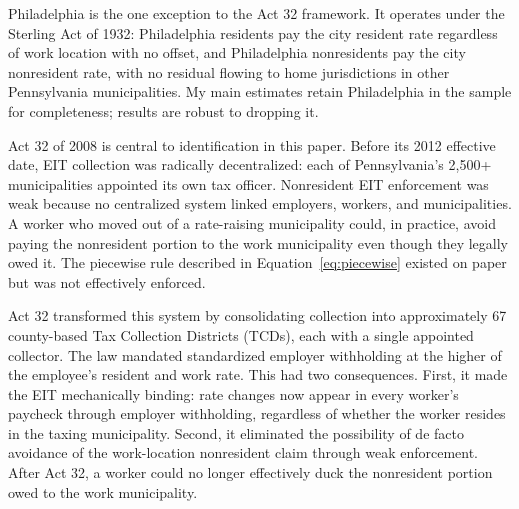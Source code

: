 \documentclass[12pt]{article}
\begin{document}
Philadelphia is the one exception to the Act 32 framework. It operates under
the Sterling Act of 1932: Philadelphia residents pay the city resident
rate regardless of work location with no offset, and Philadelphia
nonresidents pay the city nonresident rate, with no residual flowing
to home jurisdictions in other Pennsylvania municipalities. My main estimates
retain Philadelphia in the sample for completeness; results are robust
to dropping it.

Act 32 of 2008 \citep{paAct32_2008} is central to identification in this paper. Before its
2012 effective date, EIT collection was radically decentralized: each
of Pennsylvania's 2,500+ municipalities appointed its own tax officer.
Nonresident EIT enforcement was weak because no centralized system
linked employers, workers, and municipalities. A worker who moved
out of a rate-raising municipality could, in practice, avoid paying
the nonresident portion to the work municipality even though they
legally owed it. The piecewise rule described in
Equation~\ref{eq:piecewise} existed on paper but was not effectively
enforced.

Act 32 transformed this system by consolidating collection into
approximately 67 county-based Tax Collection Districts (TCDs), each with a single appointed collector.
The law mandated standardized employer withholding at the higher of
the employee's resident and work rate. This had two consequences.
First, it made the EIT mechanically binding: rate changes now
appear in every worker's paycheck through employer withholding,
regardless of whether the worker resides in the taxing municipality.
Second, it eliminated the possibility of de facto avoidance
of the work-location nonresident claim through weak enforcement.
After Act 32, a worker could no longer effectively duck the
nonresident portion owed to the work municipality.
\end{document}
